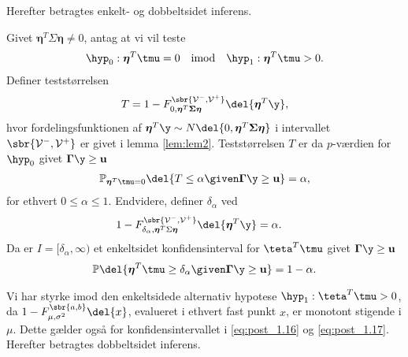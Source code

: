 Herefter betragtes enkelt- og dobbeltsidet inferens.
%
\begin{lem} \label{lem:lem3}
Givet \(\boldsymbol{\eta}^T \Sigma \boldsymbol{\eta} \neq 0\), antag at vi vil teste
\begin{align*}
\hyp_0: \boldsymbol{\eta}^T \tmu=0 \quad \text{imod} \quad \hyp_1: \boldsymbol{\eta}^T \tmu > 0.
\end{align*}
Definer teststørrelsen
\begin{align}
T=1- F_{0, \boldsymbol{\eta}^T \boldsymbol{\Sigma} \boldsymbol{\eta}}^{\sbr{\mathcal{V}^-, \mathcal{V}^+}} \del{\boldsymbol{\eta}^T \y}, \label{eq:post_1.14}
\end{align}
hvor fordelingsfunktionen af \(\boldsymbol{\eta}^T \y \sim N \del{0,  \boldsymbol{\eta}^T \boldsymbol{\Sigma} \boldsymbol{\eta}}\) i intervallet \(\sbr{\mathcal{V}^-, \mathcal{V}^+}\) er givet i lemma \ref{lem:lem2}.
Teststørrelsen \(T\) er da \(p\)-værdien for \(\hyp_0\) givet \(\boldsymbol{\Gamma} \y \geq \mathbf{u}\)
\begin{align}
\mathbb{P}_{\boldsymbol{\eta}^T \tmu=0} \del{T \leq \alpha \given \boldsymbol{\Gamma }\y \geq \mathbf{u}} = \alpha, \label{eq:post_1.15}
\end{align}
for ethvert \(0 \leq \alpha \leq 1\). 
Endvidere, definer \(\delta_{\alpha}\) ved
\begin{align}
1-F_{\delta_{\alpha}, \boldsymbol{\eta}^T \Sigma \boldsymbol{\eta}}^{\sbr{\mathcal{V}^-, \mathcal{V}^+}} \del{\boldsymbol{\eta}^T \y} &= \alpha. \label{eq:post_1.16}
\end{align}
Da er \(I= [\delta_\alpha, \infty )\) et enkeltsidet konfidensinterval for \(\teta^T \tmu\) givet \(\boldsymbol{\Gamma} \y \geq \mathbf{u}\)
\begin{align}
\mathbb{P} \del{\boldsymbol{\eta}^T \tmu \geq \delta_\alpha \given \boldsymbol{\Gamma} \y \geq \mathbf{u}} = 1- \alpha. \label{eq:post_1.17}
\end{align}
\end{lem}
%
Vi har styrke imod den enkeltsidede alternativ hypotese \(\hyp_1 : \teta^T \tmu > 0\), da \(1-F_{\mu, \sigma^2}^{\sbr{a,b}} \del{x}\), evalueret i ethvert fast punkt \(x\), er monotont stigende i \(\mu\).
Dette gælder også for konfidensintervallet i \eqref{eq:post_1.16} og \eqref{eq:post_1.17}.
Herefter betragtes dobbeltsidet inferens.
%
